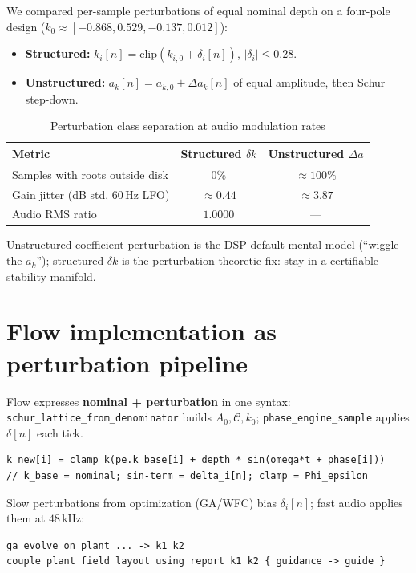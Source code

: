 \documentclass[11pt]{article}
\begin{document}
We compared per-sample perturbations of equal nominal depth on a four-pole design ($k_0\approx[-0.868,0.529,-0.137,0.012]$):

\begin{itemize}
  \item \textbf{Structured:} $k_i[n]=\mathrm{clip}(k_{i,0}+\delta_i[n])$, $|\delta_i|\le 0.28$.
  \item \textbf{Unstructured:} $a_k[n]=a_{k,0}+\Delta a_k[n]$ of equal amplitude, then Schur step-down.
\end{itemize}

\begin{table}[ht]
  \centering
  \caption{Perturbation class separation at audio modulation rates}
  \begin{tabular}{@{}lcc@{}}
    \toprule
    Metric & Structured $\delta k$ & Unstructured $\Delta a$ \\
    \midrule
    Samples with roots outside disk & $0\%$ & $\approx 100\%$ \\
    Gain jitter (dB std, 60\,Hz LFO) & $\approx 0.44$ & $\approx 3.87$ \\
    Audio RMS ratio & $1.0000$ & --- \\
    \bottomrule
  \end{tabular}
\end{table}

Unstructured coefficient perturbation is the DSP default mental model (``wiggle the $a_k$''); structured $\delta k$ is the perturbation-theoretic fix: stay in a certifiable stability manifold.

\section{Flow implementation as perturbation pipeline}

Flow expresses \textbf{nominal + perturbation} in one syntax: \texttt{schur\_lattice\_from\_denominator} builds $A_0,\mathcal{C},k_0$; \texttt{phase\_engine\_sample} applies $\delta[n]$ each tick.

\begin{lstlisting}[style=flow,caption={Per-sample structured perturbation (\texttt{lattice\_allpass\_phase\_engine.flow})}]
k_new[i] = clamp_k(pe.k_base[i] + depth * sin(omega*t + phase[i]))
// k_base = nominal; sin-term = delta_i[n]; clamp = Phi_epsilon
\end{lstlisting}

Slow perturbations from optimization (GA/WFC) bias $\delta_i[n]$; fast audio applies them at $48$\,kHz:
\begin{lstlisting}[style=flow,caption={Slow analysis $\to$ fast perturbation field}]
ga evolve on plant ... -> k1 k2
couple plant field layout using report k1 k2 { guidance -> guide }
\end{lstlisting}
\end{document}

